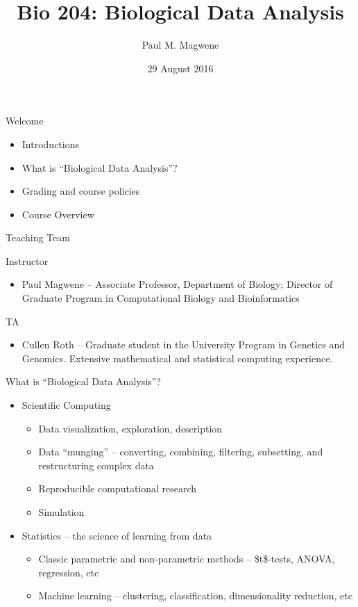 \documentclass[presentation]{beamer}
\author{Paul M. Magwene}
\date{29 August 2016}
\title{Bio 204: Biological Data Analysis}
\institute[Duke]{Department of Biology}
\begin{document}
\maketitle

\begin{frame}[label={sec:orgheadline1}]{Welcome}
\begin{itemize}
\item Introductions
\item What is ``Biological Data Analysis''?
\item Grading and course policies
\item Course Overview
\end{itemize}
\end{frame}

\begin{frame}[label={sec:orgheadline2}]{Teaching Team}
\begin{block}{Instructor}
\begin{itemize}
\item Paul Magwene -- Associate Professor, Department of Biology; Director of Graduate Program in Computational Biology and Bioinformatics
\end{itemize}
\end{block}

\begin{block}{TA}
\begin{itemize}
\item Cullen Roth -- Graduate student in the University Program in Genetics and Genomics. Extensive mathematical and statistical computing experience.
\end{itemize}
\end{block}
\end{frame}

\begin{frame}[label={sec:orgheadline3}]{What is ``Biological Data Analysis''?}
\begin{itemize}
\item Scientific Computing

\begin{itemize}
\item Data visualization, exploration, description
\item Data ``munging'' -- converting, combining, filtering, subsetting, and restructuring complex data
\item Reproducible computational research
\item Simulation
\end{itemize}

\item Statistics -- the science of learning from data

\begin{itemize}
\item Classic parametric and non-parametric methods -- \$t\$-tests, ANOVA,
regression, etc
\item Machine learning -- clustering, classification, dimensionality
reduction, etc
\end{itemize}
\end{itemize}
\end{frame}
\end{document}
